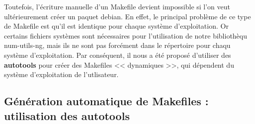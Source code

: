 Toutefois, l'\'ecriture manuelle d'un Makefile devient impossible si l'on veut ult\'erieurement cr\'eer un paquet debian.
En effet, le principal probl\`eme de ce type de Makefile est qu'il est identique pour chaque syst\`eme d'exploitation. Or certains fichiers
syst\`emes sont n\'ecessaires pour l'utilisation de notre biblioth\`equ num-utils-ng, mais ils ne sont pas forc\'ement dans le r\'epertoire pour
chaqu syst\`eme d'exploitation.
\newline 	
Par cons\'equent, il nous a \'et\'e propos\'e d'utiliser des \textbf{autotools} pour cr\'eer des Makefiles << dynamiques >>, qui d\'ependent du syst\`eme
d'exploitation de l'utlisateur.

\subsection{G\'en\'eration automatique de Makefiles : utilisation des autotools}